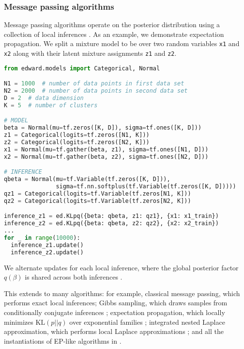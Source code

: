 \subsubsection{Message passing algorithms}

Message passing algorithms operate on the posterior distribution using
a collection of local inferences \citep{koller2009probabilistic}.
As an example, we demonstrate expectation propagation. We split a
mixture model to be over two random variables \texttt{x1} and
\texttt{x2} along with their latent mixture assignments \texttt{z1}
and \texttt{z2}.

\begin{lstlisting}[language=Python]
from edward.models import Categorical, Normal

N1 = 1000  # number of data points in first data set
N2 = 2000  # number of data points in second data set
D = 2  # data dimension
K = 5  # number of clusters

# MODEL
beta = Normal(mu=tf.zeros([K, D]), sigma=tf.ones([K, D]))
z1 = Categorical(logits=tf.zeros([N1, K]))
z2 = Categorical(logits=tf.zeros([N2, K]))
x1 = Normal(mu=tf.gather(beta, z1), sigma=tf.ones([N1, D]))
x2 = Normal(mu=tf.gather(beta, z2), sigma=tf.ones([N2, D]))

# INFERENCE
qbeta = Normal(mu=tf.Variable(tf.zeros([K, D])),
               sigma=tf.nn.softplus(tf.Variable(tf.zeros([K, D]))))
qz1 = Categorical(logits=tf.Variable(tf.zeros[N1, K]))
qz2 = Categorical(logits=tf.Variable(tf.zeros[N2, K]))

inference_z1 = ed.KLpq({beta: qbeta, z1: qz1}, {x1: x1_train})
inference_z2 = ed.KLpq({beta: qbeta, z2: qz2}, {x2: x2_train})
...
for _ in range(10000):
  inference_z1.update()
  inference_z2.update()
\end{lstlisting}

We alternate updates for each local inference, where the global
posterior factor $q(\beta)$ is shared across both inferences
\citep{gelman2014expectation}.

This extends to many algorithms: for example,
classical message passing, which performs exact local inferences;
Gibbs sampling, which draws samples from conditionally conjugate
inferences \citep{geman1984stochastic};
expectation propagation, which locally minimizes
$\text{KL}(p || q)$ over exponential families \citep{minka2001expectation};
integrated nested Laplace
approximation, which performs local Laplace approximations
\citep{rue2009approximate};
and
all the instantiations of EP-like algorithms in
\citet{gelman2014expectation}.

